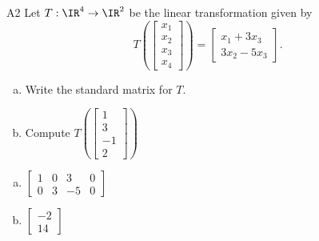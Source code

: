 \begin{problem}{A2}
Let $T: \IR^4 \rightarrow \IR^2$ be the linear transformation given by $$T\left(\begin{bmatrix} x_1 \\ x_2 \\ x_3 \\ x_4 \end{bmatrix} \right) = \begin{bmatrix} x_1+3x_3 \\ 3x_2-5x_3 \end{bmatrix}.$$
\begin{enumerate}[(a)]
\item Write the standard matrix for $T$.
\item Compute \( T\left( \begin{bmatrix} 1 \\ 3  \\ -1 \\ 2\end{bmatrix} \right) \)
\end{enumerate}
\end{problem}
\begin{solution}
\begin{enumerate}[(a)]
\item \(\begin{bmatrix} 1 & 0 & 3 & 0 \\ 0 & 3 & -5 & 0  \end{bmatrix}\)
\item \(\begin{bmatrix}  -2 \\ 14 \end{bmatrix}\)
\end{enumerate}
\end{solution}




